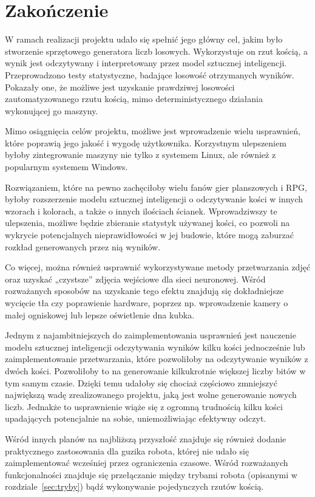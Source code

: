 
\chapter{Zakończenie}\label{ch:zakonczenie}

W ramach realizacji projektu udało się spełnić jego główny cel, jakim było stworzenie sprzętowego generatora liczb losowych.
Wykorzystuje on rzut kością, a wynik jest odczytywany i interpretowany przez model sztucznej inteligencji. Przeprowadzono
testy statystyczne, badające losowość otrzymanych wyników. Pokazały one, że możliwe jest uzyskanie prawdziwej losowości 
zautomatyzowanego rzutu kością, mimo deterministycznego działania wykonującej go maszyny.

Mimo osiągnięcia celów projektu, możliwe jest wprowadzenie wielu usprawnień, które poprawią jego jakość i wygodę użytkownika.
Korzystnym ulepszeniem byłoby zintegrowanie maszyny nie tylko z systemem Linux, ale również z popularnym systemem Windows.

Rozwiązaniem, które na pewno zachęciłoby wielu fanów gier planszowych i RPG, byłoby rozszerzenie modelu 
sztucznej inteligencji o odczytywanie kości w innych wzorach i kolorach, a także o innych ilościach ścianek.
Wprowadziwszy te ulepszenia, możliwe będzie zbieranie statystyk używanej kości, co pozwoli na wykrycie
potencjalnych nieprawidłowości w jej budowie, które mogą zaburzać rozkład generowanych przez nią wyników.

Co więcej, można również usprawnić wykorzystywane metody przetwarzania zdjęć oraz uzyskać
„czystsze” zdjęcia wejściowe dla sieci neuronowej. Wśród rozważanych sposobów na uzyskanie tego efektu znajdują się
dokładniejsze wycięcie tła czy poprawienie hardware, poprzez np. wprowadzenie kamery o małej ogniskowej lub
lepsze oświetlenie dna kubka.

Jednym z najambitniejszych do zaimplementowania usprawnień jest nauczenie modelu sztucznej inteligencji odczytywania
wyników kilku kości jednocześnie lub zaimplementowanie przetwarzania, które pozwoliłoby na odczytywanie wyników z dwóch kości.
Pozwoliłoby to na generowanie kilkukrotnie większej liczby bitów w tym samym czasie.
Dzięki temu udałoby się chociaż częściowo zmniejszyć największą wadę zrealizowanego projektu,
jaką jest wolne generowanie nowych liczb.
Jednakże to usprawnienie wiąże się z ogromną trudnością kilku kości upadających potencjalnie na sobie, uniemożliwiając efektywny odczyt.

Wśród innych planów na najbliższą przyszłość znajduje się również dodanie praktycznego zastosowania dla guzika robota,
której nie udało się zaimplementować wcześniej przez ograniczenia czasowe. Wśród rozważanych funkcjonalności znajduje się
przełączanie między trybami robota (opisanymi w rozdziale~\ref{sec:tryby}) bądź wykonywanie pojedynczych rzutów kością.

